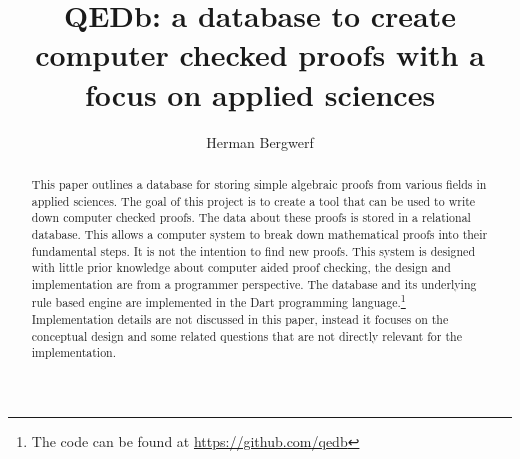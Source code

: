 \documentclass{article}
\begin{document}
\author{Herman Bergwerf}
\title{QEDb: a database to create computer checked proofs with a focus on applied sciences}
\maketitle

\begin{abstract}
This paper  outlines a database for storing simple algebraic proofs from various fields in applied sciences.  The goal of this project is to create a tool that can be used to write down computer checked proofs. The data about these proofs is stored in a relational database. This allows a computer system to break down mathematical proofs into their fundamental steps. It is not the intention to find new proofs. This system is designed with little prior knowledge about computer aided proof checking, the design and implementation are from a programmer perspective. The database and its underlying rule based engine are implemented in the Dart programming language.\footnote{The code can be found at \url{https://github.com/qedb}} Implementation details are not discussed in this paper, instead it focuses on the conceptual design and some related questions that are not directly relevant for the implementation.
\end{abstract}
\end{document}
